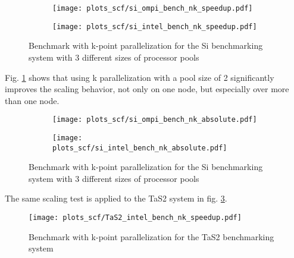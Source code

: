 \documentclass[main.tex]{subfiles}
\begin{document}
\begin{figure}[ht!]
\begin{subfigure}[b]{0.49\textwidth}
    \centering
    \texttt{[image: plots\_scf/si\_ompi\_bench\_nk\_speedup.pdf]}
\end{subfigure}
\begin{subfigure}[b]{0.49\textwidth}
    \centering
    \texttt{[image: plots\_scf/si\_intel\_bench\_nk\_speedup.pdf]}
\end{subfigure}
\caption{Benchmark with k-point parallelization for the Si benchmarking system with 3 different sizes of processor pools}
\label{fig:scaling_scf_nk_si}
\end{figure}

Fig. \ref{fig:scaling_scf_nk_si} shows that using k parallelization with a pool size of 2 significantly improves the scaling behavior, not only on one node, but especially over more than one node.



\begin{figure}[ht!]
\begin{subfigure}[b]{0.49\textwidth}
    \centering
    \texttt{[image: plots\_scf/si\_ompi\_bench\_nk\_absolute.pdf]}
\end{subfigure}
\begin{subfigure}[b]{0.49\textwidth}
    \centering
    \texttt{[image: plots\_scf/si\_intel\_bench\_nk\_absolute.pdf]}
\end{subfigure}
\caption{Benchmark with k-point parallelization for the Si benchmarking system with 3 different sizes of processor pools}
\label{fig:scaling_scf_nk_si_absolute}
\end{figure}


The same scaling test is applied to the TaS2 system in fig. \ref{fig:scaling_scf_nk_tas2}.
\begin{figure}[ht!]
    \centering
    \texttt{[image: plots\_scf/TaS2\_intel\_bench\_nk\_speedup.pdf]}
    \caption{Benchmark with k-point parallelization for the TaS2 benchmarking system}
    \label{fig:scaling_scf_nk_tas2}
\end{figure}
\end{document}
